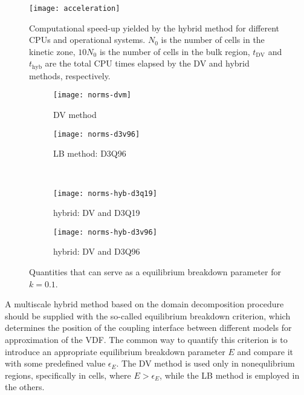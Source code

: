 \documentclass{elsarticle} %
\newcommand{\DV}{\mathrm{DV}}
\begin{document}
\begin{figure}
    \centering
    \texttt{[image: acceleration]}
    \caption{
        Computational speed-up yielded by the hybrid method for different CPUs and operational systems.
        $N_0$ is the number of cells in the kinetic zone, $10N_0$ is the number of cells in the bulk region,
        $t_\DV$ and $t_\mathrm{hyb}$ are the total CPU times elapsed by the DV and hybrid methods, respectively.
    }\label{fig:speed-up}
\end{figure}

\begin{figure}
    \centering
    \begin{subfigure}[b]{0.5\textwidth}
        \texttt{[image: norms-dvm]}
        \caption{DV method}
        \label{fig:norms:dvm}
    \end{subfigure}%
    \begin{subfigure}[b]{0.5\textwidth}
        \texttt{[image: norms-d3v96]}
        \caption{LB method: D3Q96}
        \label{fig:norms:d3q96}
    \end{subfigure}\\
    \begin{subfigure}[b]{0.5\textwidth}
        \texttt{[image: norms-hyb-d3q19]}
        \caption{hybrid: DV and D3Q19}
        \label{fig:norms:d3q19-hyb}
    \end{subfigure}%
    \begin{subfigure}[b]{0.5\textwidth}
        \texttt{[image: norms-hyb-d3v96]}
        \caption{hybrid: DV and D3Q96}
        \label{fig:norms:d3q96-hyb}
    \end{subfigure}
    \caption{
       Quantities that can serve as a equilibrium breakdown parameter for \(k=0.1\).
    }\label{fig:norms}
\end{figure}

A multiscale hybrid method based on the domain decomposition procedure should be supplied
with the so-called equilibrium breakdown criterion, which determines the position of the coupling interface
between different models for approximation of the VDF. The common way to quantify this criterion is
to introduce an appropriate equilibrium breakdown parameter \(E\) and compare it with some predefined value \(\epsilon_E\).
The DV method is used only in nonequlibrium regions, specifically in cells, where \(E>\epsilon_E\),
while the LB method is employed in the others.
\end{document}
